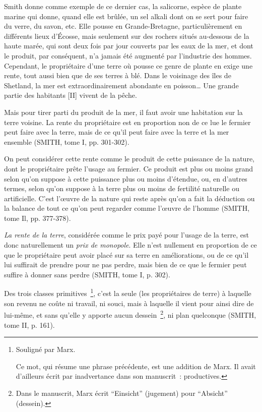 \documentclass[french,twoside]{book} %
\newcommand\foreign[1]{\emph{#1}}
\newenvironment{quoteblock}%
  {\begin{quoting}}
  {\end{quoting}}
\newenvironment{quotebar}{%
    \def\FrameCommand{{\color{rubric!10!}\vrule width 0.5em} \hspace{0.9em}}%
    \def\OuterFrameSep{\itemsep} %
    \MakeFramed {\advance\hsize-\width \FrameRestore}
  }%
  {%
    \endMakeFramed
  }
\renewenvironment{quoteblock}%
  {%
    \savenotes
    \setstretch{0.9}
    \normalfont
    \begin{quotebar}
  }
  {%
    \end{quotebar}
    \spewnotes
  }
\begin{document}
\noindent Smith donne comme exemple de ce dernier cas, la salicorne, espèce de plante marine qui donne, quand elle est brûlée, un sel alkali dont on se sert pour faire du verre, du savon, etc. Elle pousse en Grande-Bretagne, particulièrement en différents lieux d’Écosse, mais seulement sur des rochers situés au-dessous de la haute marée, qui sont deux fois par jour couverts par les eaux de la mer, et dont le produit, par conséquent, n’a jamais été augmenté par l’industrie des hommes. Cependant, le propriétaire d’une terre où pousse ce genre de plante en exige une rente, tout aussi bien que de ses terres à blé. Dans le voisinage des îles de Shetland, la mer est extraordinairement abondante en poisson… Une grande partie des habitants [II] vivent de la pêche.\par

\begin{quoteblock}
 \noindent Mais pour tirer parti du produit de la mer, il faut avoir une habitation sur la terre voisine. La rente du propriétaire est en proportion non de ce lue le fermier peut faire avec la terre, mais de ce qu’il peut faire avec la terre et la mer ensemble (SMITH, tome I, pp. 301-302).\par
 On peut considérer cette rente comme le produit de cette puissance de la nature, dont le propriétaire prête l’usage au fermier. Ce produit est plus ou moins grand selon qu’on suppose à cette puissance plus ou moins d’étendue, ou, en d’autres termes, selon qu’on suppose à la terre plus ou moins de fertilité naturelle ou artificielle. C’est l’œuvre de la nature qui reste après qu’on a fait la déduction ou la balance de tout ce qu’on peut regarder comme l’œuvre de l’homme (SMITH, tome Il, pp. 377-378).\par
 \foreign{La rente de la terre}, considérée comme le prix payé pour l’usage de la terre, est donc naturellement un \foreign{prix de monopole}. Elle n’est nullement en proportion de ce que le propriétaire peut avoir placé sur sa terre en améliorations, ou de ce qu’il lui suffirait de prendre pour ne pas perdre, mais bien de ce que le fermier peut suffire à donner sans perdre (SMITH, tome I, p. 302).\par
 Des trois classes primitives \footnote{ \noindent Souligné par Marx.\par
 Ce mot, qui résume une phrase précédente, est une addition de Marx. Il avait d’ailleurs écrit par inadvertance dans son manuscrit : productives.
}, c’est la seule (les propriétaires de terre) à laquelle son revenu ne coûte ni travail, ni souci, mais à laquelle il vient pour ainsi dire de lui-même, et sans qu’elle y apporte aucun dessein \footnote{Dans le manuscrit, Marx écrit “Einsicht” (jugement) pour “Absicht” (dessein).}, ni plan quelconque (SMITH, tome II, p. 161).
 \end{quoteblock}
\end{document}
